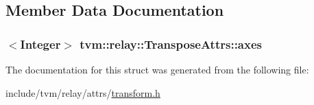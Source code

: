\subsection{Member Data Documentation}
\subsubsection[{\texorpdfstring{axes}{axes}}]{$<${\bf Integer}$>$ tvm\+::relay\+::\+Transpose\+Attrs\+::axes}\hypertarget{structtvm_1_1relay_1_1TransposeAttrs_a69ccef64142afaab9a5fc6015714ab55}{}\label{structtvm_1_1relay_1_1TransposeAttrs_a69ccef64142afaab9a5fc6015714ab55}


The documentation for this struct was generated from the following file\+:\begin{DoxyCompactItemize}
\item 
include/tvm/relay/attrs/\hyperlink{include_2tvm_2relay_2attrs_2transform_8h}{transform.\+h}\end{DoxyCompactItemize}
